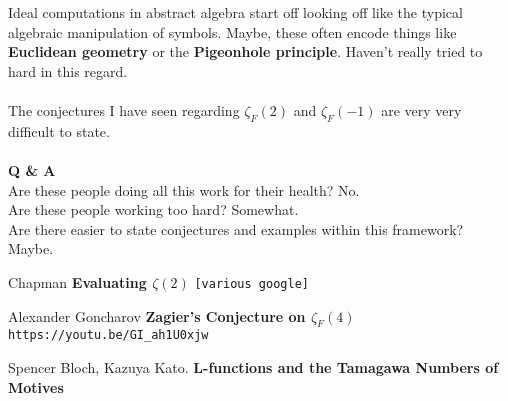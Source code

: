 \documentclass[12pt]{article}
\begin{document}
\newpage

\noindent Ideal computations in abstract algebra start off looking off like the typical algebraic manipulation of symbols.  Maybe, these often encode things like \textbf{Euclidean geometry} or the \textbf{Pigeonhole principle}.  Haven't really tried to hard in this regard.  \\ \\
The conjectures I have seen regarding $\zeta_F(2)$ and $\zeta_F(-1)$ are very very difficult to state. \\ \\
\textbf{Q \& A} \\
Are these people doing all this work for their health?  No. \\
Are these people working too hard?  Somewhat. \\
Are there easier to state conjectures and examples within this framework?  Maybe. 

\vfill

\begin{thebibliography}{}

\item Chapman \textbf{Evaluating $\zeta(2)$} \texttt{[various google]}

\item Alexander Goncharov \textbf{Zagier's Conjecture on $\zeta_F(4)$} \texttt{https://youtu.be/GI\_{}ah1U0xjw}

\item Spencer Bloch, Kazuya Kato. \textbf{L-functions and the Tamagawa Numbers of Motives}
 
\end{thebibliography}
\end{document}
